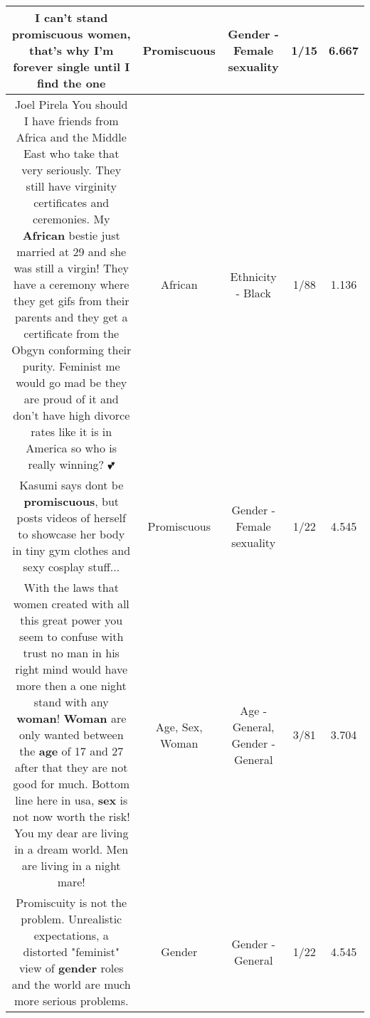 \documentclass[11pt]{article}
\newlength\mylength
\begin{document}
\begin{center}
\begin{longtable}{|C{.65\mylength}|C{.30\mylength}|C{.12\mylength}|C{.12\mylength}|C{.12\mylength}|}
  \small I can't stand \textbf{promiscuous} women, that's why I'm forever single until I find the one\normalsize   & Promiscuous & Gender - Female sexuality & 1/15 & 6.667 \\  \hline
  \small Joel Pirela You should I have friends from Africa and the Middle East who take that very seriously. They still have virginity certificates and ceremonies. My \textbf{African} bestie just married at 29 and she was still a virgin! They have a ceremony  where they get gifs from their parents and they get a certificate from the Obgyn conforming their purity. Feminist me would go mad be they are proud of it and don't have high divorce rates like it is in America so who is really winning? 💕\normalsize   & African & Ethnicity - Black & 1/88 & 1.136 \\  \hline
  \small Kasumi says dont be \textbf{promiscuous}, but posts videos of herself to showcase her body in tiny gym clothes and sexy cosplay stuff...\normalsize   & Promiscuous & Gender - Female sexuality & 1/22 & 4.545 \\  \hline
  \small With the laws that women created with all this great power you seem to confuse with trust no man in his right mind would have more then a one night stand with any \textbf{woman}! \textbf{Woman} are only wanted between the \textbf{age} of 17 and 27 after that they are not good for much. Bottom line here in usa, \textbf{sex} is not now worth the risk! You my dear are living in a dream world. Men are living in a night mare!\normalsize   & Age, Sex, Woman & Age - General, Gender - General & 3/81 & 3.704 \\  \hline
  \small Promiscuity is not the problem. Unrealistic expectations, a distorted "feminist" view of \textbf{gender} roles and the world are much more serious problems.\normalsize   & Gender & Gender - General & 1/22 & 4.545 \\  \hline

\end{longtable}
\end{center}
\end{document}
